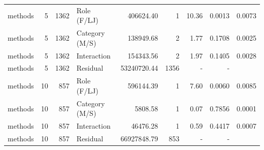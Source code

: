 \begin{table}[H]
{\begin{tabular}{l r r l r r r r r}
methods & 5 & 1362 & Role (F/LJ) & 406624.40 & 1 & 10.36 & 0.0013 & 0.0073 \\ 
methods & 5 & 1362 & Category (M/S) & 138949.68 & 2 & 1.77 & 0.1708 & 0.0025 \\ 
methods & 5 & 1362 & Interaction & 154343.56 & 2 & 1.97 & 0.1405 & 0.0028 \\ 
methods & 5 & 1362 & Residual & 53240720.44 & 1356 & - & -  \\ 
methods & 10 & 857 & Role (F/LJ) & 596144.39 & 1 & 7.60 & 0.0060 & 0.0085 \\ 
methods & 10 & 857 & Category (M/S) & 5808.58 & 1 & 0.07 & 0.7856 & 0.0001 \\ 
methods & 10 & 857 & Interaction & 46476.28 & 1 & 0.59 & 0.4417 & 0.0007 \\ 
methods & 10 & 857 & Residual & 66927848.79 & 853 & - & -  \\ 
\bottomrule
\end{tabular}%
} 
\end{table}
\newpage 
